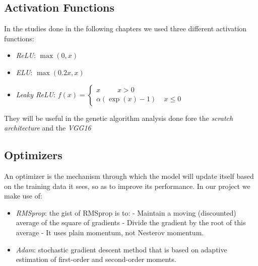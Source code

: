 \subsection{Activation Functions}
In the studies done in the following chapters we used three different activation functions:
\begin{itemize}
	\item \textit{ReLU}: 
	$ \max (0,x) $
	\item \textit{ELU}: $ \max (0.2x,x) $
	\item \textit{Leaky ReLU}: 
	$ 
		f(x) = \begin{cases}
		x \ \ \ \ \ \ \ \ \ \ \ x>0 \\
		\alpha(\exp(x) -1) \ \ \ \ \ x\le0
		\end{cases}
	$
\end{itemize}
They will be useful in the genetic algorithm analysis done fore the \textit{scratch architecture} and the \textit{VGG16}

\subsection{Optimizers}
An optimizer is the mechanism through which the model will update itself based on the training data it sees, so as to improve its performance. In our project we make use of:

\begin{itemize}
	\item \textit{RMSprop}: the gist of RMSprop is to:
		\subitem - Maintain a moving (discounted) average of the square of gradients
		\subitem - Divide the gradient by the root of this average
		\subitem - It uses plain momentum, not Nesterov momentum.
	\item \textit{Adam}: stochastic gradient descent method that is based on adaptive estimation of first-order and second-order moments.
\end{itemize}

